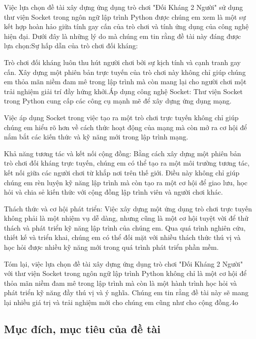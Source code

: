 \documentclass[a4paper]{article}
\begin{document}
Việc lựa chọn đề tài xây dựng ứng dụng trò chơi "Đối Kháng 2 Người" sử dụng thư viện Socket trong ngôn ngữ lập trình Python được chúng em xem là một sự kết hợp hoàn hảo giữa tính gay cấn của trò chơi và tính ứng dụng của công nghệ hiện đại. Dưới đây là những lý do mà chúng em tin rằng đề tài này đáng được lựa chọn:Sự hấp dẫn của trò chơi đối kháng: 

Trò chơi đối kháng luôn thu hút người chơi bởi sự kịch tính và cạnh tranh gay cấn. Xây dựng một phiên bản trực tuyến của trò chơi này không chỉ giúp chúng em thỏa mãn niềm đam mê trong lập trình mà còn mang lại cho người chơi một trải nghiệm giải trí đầy hứng khởi.Áp dụng công nghệ Socket: Thư viện Socket trong Python cung cấp các công cụ mạnh mẽ để xây dựng ứng dụng mạng. 

Việc áp dụng Socket trong việc tạo ra một trò chơi trực tuyến không chỉ giúp chúng em hiểu rõ hơn về cách thức hoạt động của mạng mà còn mở ra cơ hội để nắm bắt các kiến thức và kỹ năng mới trong lập trình mạng.

Khả năng tương tác và kết nối cộng đồng: Bằng cách xây dựng một phiên bản trò chơi đối kháng trực tuyến, chúng em có thể tạo ra một môi trường tương tác, kết nối giữa các người chơi từ khắp nơi trên thế giới. Điều này không chỉ giúp chúng em rèn luyện kỹ năng lập trình mà còn tạo ra một cơ hội để giao lưu, học hỏi và chia sẻ kiến thức với cộng đồng lập trình viên và người chơi khác.

Thách thức và cơ hội phát triển: Việc xây dựng một ứng dụng trò chơi trực tuyến không phải là một nhiệm vụ dễ dàng, nhưng cũng là một cơ hội tuyệt vời để thử thách và phát triển kỹ năng lập trình của chúng em. 
Qua quá trình nghiên cứu, thiết kế và triển khai, chúng em có thể đối mặt với nhiều thách thức thú vị và học hỏi được nhiều kỹ năng mới trong quá trình phát triển phần mềm.

Tóm lại, việc lựa chọn đề tài xây dựng ứng dụng trò chơi "Đối Kháng 2 Người" với thư viện Socket trong ngôn ngữ lập trình Python không chỉ là một cơ hội để thỏa mãn niềm đam mê trong lập trình mà còn là một hành trình học hỏi và phát triển kỹ năng đầy thú vị và ý nghĩa. Chúng em tin rằng đề tài này sẽ mang lại nhiều giá trị và trải nghiệm mới cho chúng em cũng như cho cộng đồng.4o

\hypertarget{mux1ee5c-ux111uxedch-mux1ee5c-tiuxeau-cux1ee7a-ux111ux1ec1-tuxe0i}{%
\subsection{Mục đích, mục tiêu của đề
tài}\label{mux1ee5c-ux111uxedch-mux1ee5c-tiuxeau-cux1ee7a-ux111ux1ec1-tuxe0i}}
\end{document}
